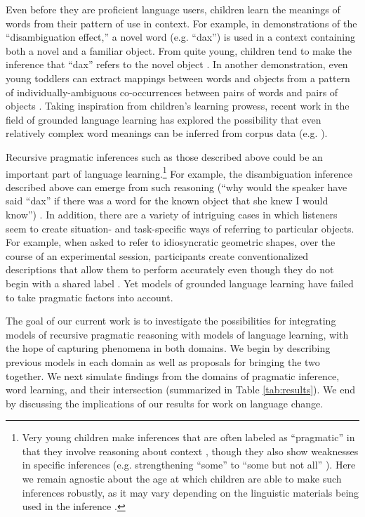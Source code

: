 \documentclass{article} %
\begin{document}
Even before they are proficient language users, children learn the meanings of words from their pattern of use in context. For example, in demonstrations of the ``disambiguation effect,'' a novel word (e.g. ``dax'') is used in a context containing both a novel and a familiar object. From quite young, children tend to make the inference that ``dax'' refers to the novel object \cite{markman1988}. In another demonstration, even young toddlers can extract mappings between words and objects from a pattern of individually-ambiguous co-occurrences between pairs of words and pairs of objects \cite{smith2008}. Taking inspiration from children's learning prowess, recent work in the field of grounded language learning has explored the possibility that even relatively complex word meanings can be inferred from corpus data (e.g. \cite{zettlemoyer2005,chen2008,frank2009,kwiatkowski2010,johnson2012}).

Recursive pragmatic inferences such as those described above could be an important part of language learning.\footnote{Very young children make inferences that are often labeled as ``pragmatic'' in that they involve reasoning about context \cite{clark1988,baldwin1993}, though they also show weaknesses in specific inferences (e.g. strengthening ``some'' to ``some but not all'' \cite{papafragou2003}). Here we remain agnostic about the age at which children are able to make such inferences robustly, as it may vary depending on the linguistic materials being used in the inference \cite{barner2011}.} For example, the disambiguation inference described above can emerge from such reasoning (``why would the speaker have said ``dax'' if there was a word for the known object that she knew I would know'') \cite{clark1988}. In addition, there are a variety of intriguing cases in which listeners seem to create situation- and task-specific ways of referring to particular objects. For example, when asked to refer to idiosyncratic geometric shapes, over the course of an experimental session, participants create conventionalized descriptions that allow them to perform accurately even though they do not begin with a shared label \cite{krauss1964,clark1986}. Yet models of grounded language learning have failed to take pragmatic factors into account.

The goal of our current work is to investigate the possibilities for integrating models of recursive pragmatic reasoning with models of language learning, with the hope of capturing phenomena in both domains. We begin by describing previous models in each domain as well as proposals for bringing the two together. We next simulate findings from the domains of pragmatic inference, word learning, and their intersection (summarized in Table \ref{tab:results}). We end by discussing the implications of our results for work on language change.
\end{document}
